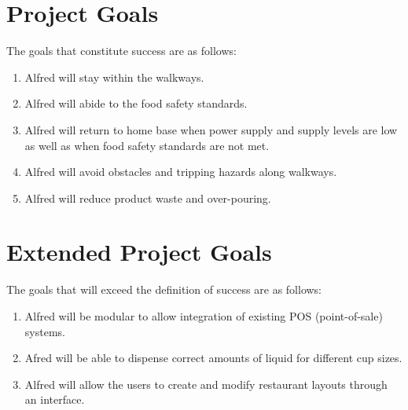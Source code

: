 \documentclass [11pt]{article}
\begin{document}

\section{Project Goals}
The goals that constitute success are as follows:

\begin{enumerate}[label=G\arabic*:, ref =\arabic*, leftmargin=0.5in]
	
	\item Alfred will stay within the walkways.
	\item Alfred will abide to the food safety standards. 
	\item Alfred will return to home base when power supply and supply levels are low as well as when food safety standards are not met.
	\item Alfred will avoid obstacles and tripping hazards along walkways.
	\item Alfred will reduce product waste and over-pouring.	
	
\end{enumerate}


\section{Extended Project Goals}
The goals that will exceed the definition of success are as follows: 

\begin{enumerate}[label=E\arabic*:, ref =\arabic*, leftmargin=0.5in]	

	\item Alfred will be modular to allow integration of existing POS (point-of-sale) systems.
	\item Afred will be able to dispense correct amounts of liquid for different cup sizes.
	\item Alfred will allow the users to create and modify restaurant layouts through an interface.

\end{enumerate}
\end{document}
